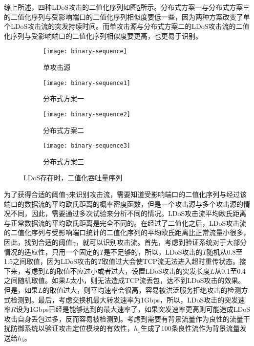 综上所述，四种LDoS攻击的二值化序列如图\ref{fig:binary-sequence-all}所示。分布式方案一与分布式方案三的二值化序列与受影响端口的二值化序列相似度要低一些，因为两种方案改变了单个LDoS攻击流的突发持续时间。而单攻击源与分布式方案二的LDoS攻击流的二值化序列与受影响端口的二值化序列相似度要更高，也更易于识别。


\begin{figure}
    \begin{subfigure}{.49\textwidth}
        \centering
        \texttt{[image: binary-sequence]}
        \caption{单攻击源}
        \label{fig:binary-sequence-single}
    \end{subfigure}
    \begin{subfigure}{.49\textwidth}
        \centering
        \texttt{[image: binary-sequence1]}
        \caption{分布式方案一}
        \label{fig:binary-sequence-2h-mod1}
    \end{subfigure}

    \begin{subfigure}{.49\textwidth}
        \centering
        \texttt{[image: binary-sequence2]}
        \caption{分布式方案二}
        \label{fig:binary-sequence-2h-mod2}
    \end{subfigure}
    \begin{subfigure}{.49\textwidth}
        \centering
        \texttt{[image: binary-sequence3]}
        \caption{分布式方案三}
        \label{fig:binary-sequence-2h-mod3}
    \end{subfigure}


    \caption{LDoS存在时，二值化吞吐量序列}
    \label{fig:binary-sequence-all}
\end{figure}




为了获得合适的阈值$\gamma$来识别攻击流，需要知道受影响端口的二值化序列与经过该端口的数据流的平均欧氏距离的概率密度函数，但是一个攻击源与多个攻击源的情况不同，因此，需要通过多次试验来分析不同的情况。LDoS攻击流平均欧氏距离与正常数据流的平均欧氏距离是完全不同的。在经过了二值化之后，LDoS攻击流的二值化序列与受影响端口统计的二值化序列的平均欧氏距离比正常流量小很多，因此，找到合适的阈值$\gamma$，就可以识别攻击流。首先，考虑到验证系统对于大部分情况的适应性，只用一个固定的$T$是不足够的，所以，LDoS攻击的$T$随机从0.8至1.5之间取值，因为LDoS攻击的$T$取值过大会使TCP流无法进入超时重传状态。接下来，考虑到$L$的取值不应过小或者过大，设置LDoS攻击的突发长度$L$从0.1至0.4之间随机取值。如果$L$太小，则无法造成TCP流丢包，达不到LDoS攻击的效果。但是，如果$L$的取值过大，则平均速率会很高，容易被洪泛服务拒绝攻击的检测方式检测到。最后，考虑交换机最大转发速率为1Gbps，所以，LDoS攻击的突发速率$R$设为1Gbps已经是能够达到的最大速率了，如果突发速率更高则可能造成LDoS攻击自身丢包过多，反而容易被检测到。考虑到需要有背景流量作为良性的流量干扰防御系统以验证攻击定位模块的有效性，$h_1$生成了100条良性流作为背景流量发送给$h_5$。

